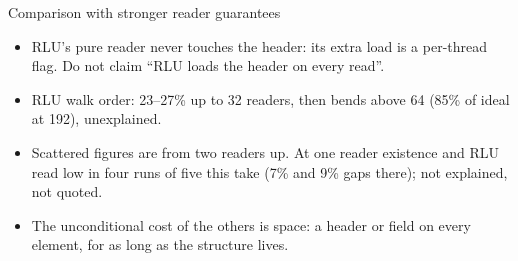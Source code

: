 \documentclass[aspectratio=169, 10pt, t, xcolor=table]{beamer}
\begin{document}
\begin{frame}{Comparison with stronger reader guarantees}
{\begin{itemize}
      comparison is decided. The others must first load what they test; ours
      tests a value the reader already holds. The 1 is not bold on purpose.
\item RLU's pure reader never touches the header: its extra load is a
      per-thread flag. Do not claim ``RLU loads the header on every read''.
\item RLU walk order: 23--27\% up to 32 readers, then bends above 64 (85\% of
      ideal at 192), unexplained.
\item Scattered figures are from two readers up. At one reader existence and
      RLU read low in four runs of five this take (7\% and 9\% gaps there);
      not explained, not quoted.
\item The unconditional cost of the others is space: a header or field on
      every element, for as long as the structure lives.
\end{itemize}}
\end{frame}
\end{document}
